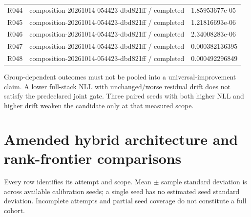 \documentclass[10pt]{article}
\begin{document}
{\begin{longtable}{p{}p{}p{}}
R044 & composition-20261014-054423-dbd821ff / completed & 1.85953677e-05 \\
R045 & composition-20261014-054423-dbd821ff / completed & 1.21816693e-06 \\
R046 & composition-20261014-054423-dbd821ff / completed & 2.34008283e-06 \\
R047 & composition-20261014-054423-dbd821ff / completed & 0.000382136395 \\
R048 & composition-20261014-054423-dbd821ff / completed & 0.000492296849 \\
\end{longtable}}

Group-dependent outcomes must not be pooled into a universal-improvement claim. A lower full-stack NLL with unchanged/worse residual drift does not satisfy the predeclared joint gate. Three paired seeds with both higher NLL and higher drift weaken the candidate only at that measured scope.

\section{Amended hybrid architecture and rank-frontier comparisons}

Every row identifies its attempt and scope. Mean \(\pm\) sample standard deviation is across available calibration seeds; a single seed has no estimated seed standard deviation. Incomplete attempts and partial seed coverage do not constitute a full cohort.
\end{document}
